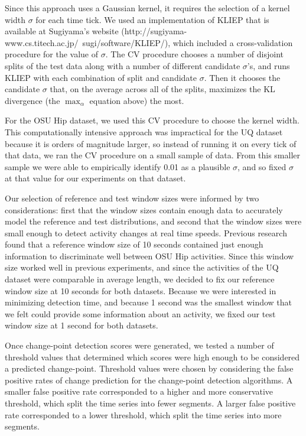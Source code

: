 Since this approach uses a Gaussian kernel, it requires the selection of
a kernel width $\sigma$ for each time tick. We used an implementation of
KLIEP that is available at Sugiyama's website
(http://sugiyama-www.cs.titech.ac.jp/~sugi/software/KLIEP/),
which included a cross-validation
procedure for the value of $\sigma$. The CV procedure chooses a number of disjoint
splits of the test data along with a number of different candidate $\sigma$'s, and runs
KLIEP with each combination of split and candidate $\sigma$. Then it chooses the candidate $\sigma$
that, on the average across all of the splits, maximizes the KL divergence (the
$\max_{\alpha}$ equation above) the most.

For the OSU Hip dataset, we used this CV procedure to choose the kernel width.
This computationally intensive approach was
impractical for the UQ dataset because it is orders of magnitude larger,
so instead of running it on every tick of that data, we ran the CV procedure on
a small sample of data. From this smaller sample we were able
to empirically identify 0.01 as a plausible $\sigma$, and so fixed $\sigma$
at that value for our experiments on that dataset.

Our selection of reference and test window sizes were informed by two considerations:
first that the window sizes contain enough data to accurately model the
reference and test distributions, and second that the window sizes were small enough
to detect activity changes at real time speeds.
Previous research \cite{zheng12} found that a reference window size of 10
seconds contained just enough information to discriminate well between OSU Hip activities.
Since this window size worked well in previous experiments, and since the 
activities of the UQ dataset were comparable in average length, we decided to
fix our reference window size at 10 seconds for both datasets. Because we were interested in
minimizing detection time, and because 1 second was the smallest window that
we felt could provide some information about an activity, we fixed our test
window size at 1 second for both datasets.

Once change-point detection scores were generated, we tested a number of threshold values that determined which
scores were high enough to be considered a predicted change-point.
Threshold values were chosen by considering the false positive rates of
change prediction for the change-point detection algorithms. A smaller false positive rate
corresponded to a higher and more conservative threshold, which split the
time series into fewer segments. A larger false positive rate
corresponded to a lower threshold, which split the time series into more segments.
